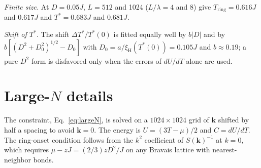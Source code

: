 \documentclass[prb,reprint,longbibliography,superscriptaddress,amsmath,amssymb]{revtex4-2}
\newcommand{\Ts}{T^{*}}
\newcommand{\Tr}{T_{\mathrm{ring}}}
\newcommand{\xiH}{\xi_{\mathrm{H}}}
\newcommand{\kv}{\mathbf{k}}
\begin{document}
\textit{Finite size.} At $D=0.05J$, $L=512$ and 1024 ($L/\lambda=4$ and 8) give $\Tr=0.616J$ and $0.617J$ and $\Ts=0.683J$ and $0.681J$.

\textit{Shift of $\Ts$.} The shift $\Delta\Ts/\Ts(0)$ is fitted equally well by $b|D|$ and by $b[(D^2+D_0^2)^{1/2}-D_0]$ with $D_0=a/\xiH(\Ts(0))=0.105J$ and $b\approx0.19$; a pure $D^2$ form is disfavored only when the errors of $dU/dT$ alone are used.

\section{Large-\texorpdfstring{$N$}{N} details}
\label{app:largeN}

The constraint, Eq.~\eqref{eq:largeN}, is solved on a $1024\times1024$ grid of $\kv$ shifted by half a spacing to avoid $\kv=0$. The energy is $U=(3T-\mu)/2$ and $C=dU/dT$. The ring-onset condition follows from the $k^2$ coefficient of $S(\kv)^{-1}$ at $k=0$, which requires $\mu-zJ=(2/3)zD^2/J$ on any Bravais lattice with nearest-neighbor bonds.


\end{document}

